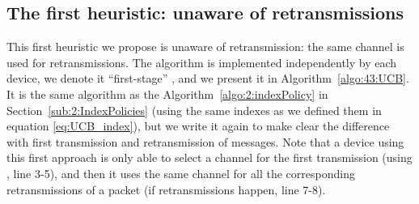 

\subsection{The first heuristic: \UCB{} unaware of retransmissions}
\label{sub:43:UCBnaive}


This first heuristic we propose is unaware of retransmission: the same channel is used for retransmissions.
The \UCB{} algorithm is implemented independently by each device, we denote it ``first-stage'' \UCB, and we present it in Algorithm~\ref{algo:43:UCB}.
It is the same algorithm as the Algorithm~\ref{algo:2:indexPolicy} in Section~\ref{sub:2:IndexPolicies} (using the same \UCB{} indexes as we defined them in equation \eqref{eq:UCB_index}),
but we write it again to make clear the difference with first transmission and retransmission of messages.
%
Note that a device using this first approach is only able to select a channel for the first transmission (using \UCB, line 3-5), and then it uses the same channel for all the corresponding retransmissions of a packet (if retransmissions happen, line 7-8).


